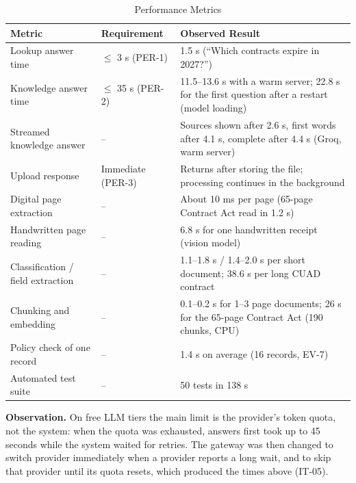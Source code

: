 \begin{table}[H]\centering
\caption{Performance Metrics}\label{tab:perf}
\begin{tabularx}{\textwidth}{|p{4.4cm}|p{3.2cm}|X|}\hline
\textbf{Metric} & \textbf{Requirement} & \textbf{Observed Result} \\ \hline
Lookup answer time & $\leq$ 3 s (PER-1) & 1.5 s (``Which contracts expire in 2027?'') \\ \hline
Knowledge answer time & $\leq$ 35 s (PER-2) & 11.5--13.6 s with a warm server; 22.8 s for the first question after a restart (model loading) \\ \hline
Streamed knowledge answer & -- & Sources shown after 2.6 s, first words after 4.1 s, complete after 4.4 s (Groq, warm server) \\ \hline
Upload response & Immediate (PER-3) & Returns after storing the file; processing continues in the background \\ \hline
Digital page extraction & -- & About 10 ms per page (65-page Contract Act read in 1.2 s) \\ \hline
Handwritten page reading & -- & 6.8 s for one handwritten receipt (vision model) \\ \hline
Classification / field extraction & -- & 1.1--1.8 s / 1.4--2.0 s per short document; 38.6 s per long CUAD contract \\ \hline
Chunking and embedding & -- & 0.1--0.2 s for 1--3 page documents; 26 s for the 65-page Contract Act (190 chunks, CPU) \\ \hline
Policy check of one record & -- & 1.4 s on average (16 records, EV-7) \\ \hline
Automated test suite & -- & 50 tests in 138 s \\ \hline
\end{tabularx}
\end{table}

\noindent\textbf{Observation.} On free LLM tiers the main limit is the provider's token quota, not the
system: when the quota was exhausted, answers first took up to 45 seconds while the system waited for
retries. The gateway was then changed to switch provider immediately when a provider reports a long
wait, and to skip that provider until its quota resets, which produced the times above (IT-05).

